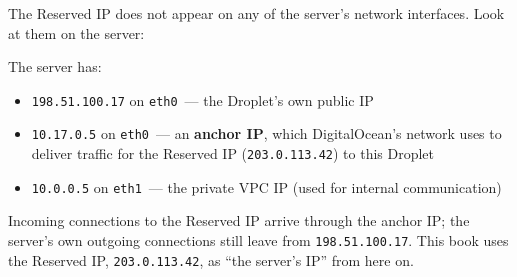 \begin{codebox}[short]

\begin{Shaded}
\begin{Highlighting}[]
\end{Highlighting}
\end{Shaded}

\end{codebox}

\noindent{}The Reserved IP does not appear on any of the server's network interfaces. Look at them on the server:

\begin{codebox}[short]

\begin{Shaded}
\begin{Highlighting}[]
\end{Highlighting}
\end{Shaded}

\end{codebox}

\noindent{}The server has:

\begin{itemize}
\tightlist
\item
  \texttt{198.51.100.17} on \texttt{eth0}~--- the Droplet's own public IP
\item
  \texttt{10.17.0.5} on \texttt{eth0}~--- an \textbf{anchor IP}, which DigitalOcean's network uses to deliver traffic for the Reserved IP (\texttt{203.0.113.42}) to this Droplet
\item
  \texttt{10.0.0.5} on \texttt{eth1}~--- the private VPC IP (used for internal communication)
\end{itemize}

\noindent{}Incoming connections to the Reserved IP arrive through the anchor IP; the server's own outgoing connections still leave from \texttt{198.51.100.17}. This book uses the Reserved IP, \texttt{203.0.113.42}, as ``the server's IP'' from here on.

